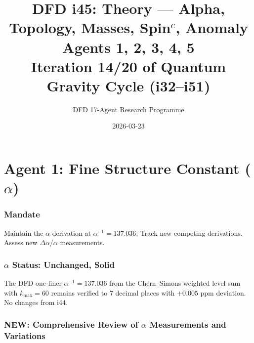 \documentclass[11pt,a4paper]{article}
\title{DFD i45: Theory --- Alpha, Topology, Masses, Spin$^c$, Anomaly\\[6pt]
\large Agents 1, 2, 3, 4, 5\\[6pt]
\normalsize Iteration 14/20 of Quantum Gravity Cycle (i32--i51)}
\author{DFD 17-Agent Research Programme}
\date{2026-03-23}
\newcommand{\NEW}{\textcolor{dfdblue}{\textbf{NEW}}}
\begin{document}
\maketitle
\tableofcontents
\newpage

\part{Agent 1: Fine Structure Constant ($\alpha$)}
\label{part:agent1}

\section{Mandate}

Maintain the $\alpha$ derivation at $\alpha^{-1} = 137.036$. Track new competing derivations. Assess new $\Delta\alpha/\alpha$ measurements.

\section{$\alpha$ Status: Unchanged, Solid}

The DFD one-liner $\alpha^{-1} = 137.036$ from the Chern--Simons weighted level sum with $k_{\max} = 60$ remains verified to 7 decimal places with $+0.005$ ppm deviation. No changes from i44.

\section{\NEW: Comprehensive Review of $\alpha$ Measurements and Variations}
\end{document}
